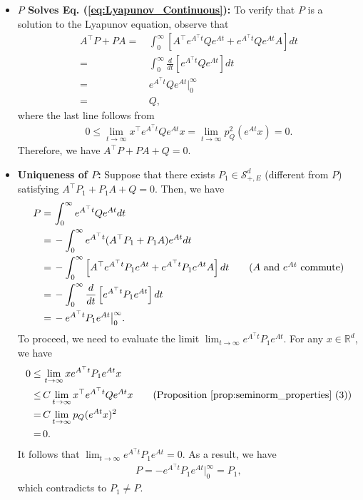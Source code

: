 \documentclass[11 pt]{article}
\begin{document}
\begin{itemize}
\begin{itemize}
			
			\item \textbf{$P$ Solves Eq. (\ref{eq:Lyapunov_Continuous}):} To verify that $P$ is a solution to the Lyapunov equation, observe that
			\begin{align*}
				A^\top P+PA=\,&\int_0^\infty \left[A^\top e^{A^\top t}Qe^{At}+e^{A^\top t}Qe^{At} A\right] dt\\
				=\,&\int_0^\infty \frac{d}{dt}\left[e^{A^\top t}Qe^{At}\right] dt\\
				=\,&e^{A^\top t}Qe^{At}\big|_0^\infty\\
				=\,&Q,
			\end{align*}
			where the last line follows from 
			\begin{align*}
				0\leq \lim_{t\rightarrow\infty}x^\top e^{A^\top t}Qe^{At} x= \lim_{t\rightarrow\infty}p_Q^2(e^{At}x)=0.
			\end{align*}
			Therefore, we have $A^\top P+PA+Q=0$.
			\item \textbf{Uniqueness of $P$:} Suppose that there exists $P_1\in\mathcal{S}_{+,E}^d$ (different from $P$) satisfying $A^\top P_1+P_1A+Q=0$. Then, we have
			\begin{align*}
				P=\,&\int_0^\infty e^{A^\top t}Qe^{At}dt\\
				=\,&-\int_0^\infty e^{A^\top t}(A^\top P_1+P_1A)e^{At}dt\\
				=\,&-\int_0^\infty \left[A^\top e^{A^\top t} P_1e^{At}+e^{A^\top t}P_1e^{At}A\right]dt\tag{$A$ and $e^{At}$ commute}\\
				=\,&-\int_0^\infty\frac{d}{dt}\left[e^{A^\top t} P_1e^{At}\right]dt\\
				=\,&-e^{A^\top t} P_1e^{At}\big|_0^\infty.
			\end{align*}
			To proceed, we need to evaluate the limit $\lim_{t\rightarrow\infty}e^{A^\top t} P_1e^{At}$. For any $x\in\mathbb{R}^d$, we have
			\begin{align*}
				0\leq\,& \lim_{t\rightarrow\infty}xe^{A^\top t} P_1e^{At}x\\
				\leq\,& C\lim_{t\rightarrow\infty}x^\top e^{A^\top t} Qe^{At}x\tag{Proposition \ref{prop:seminorm_properties} (3)}\\
				=\,&C\lim_{t\rightarrow\infty}p_Q(e^{At}x)^2\\
				=\,&0.
			\end{align*}
			It follows that $\lim_{t\rightarrow\infty}e^{A^\top t} P_1e^{At}=0$. As a result, we have
			\begin{align*}
				P=-e^{A^\top t} P_1e^{At}\big|_0^\infty=P_1,
			\end{align*}    
			which contradicts to $P_1\neq P$. 
		\end{itemize}
	\end{itemize}
	
\end{document}
